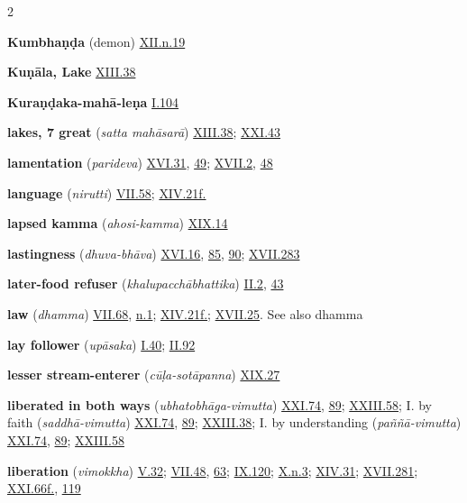 \begin{multicols}{2}
\begin{vismHanging}
\par\textbf{Kumbhaṇḍa} (demon) \hyperlink{XII.n19}{XII.n.19}{}
\par\textbf{Kuṇāla, Lake} \hyperlink{XIII.38}{XIII.38}{}
\par\textbf{Kuraṇḍaka-mahā-leṇa} \hyperlink{I.104}{I.104}{}
\par\textbf{lakes, 7 great} (\emph{satta mahāsarā}) \hyperlink{XIII.38}{XIII.38}{}; \hyperlink{XXI.43}{XXI.43}{}
\par\textbf{lamentation} (\emph{parideva}) \hyperlink{XVI.31}{XVI.31}{}, \hyperlink{XVI.49}{49}{}; \hyperlink{XVII.2}{XVII.2}{}, \hyperlink{XVII.48}{48}{}
\par\textbf{language} (\emph{nirutti}) \hyperlink{VII.58}{VII.58}{}; \hyperlink{XIV.21}{XIV.21f.}{}
\par\textbf{lapsed kamma} (\emph{ahosi-kamma}) \hyperlink{XIX.14}{XIX.14}{}
\par\textbf{lastingness} (\emph{dhuva-bhāva}) \hyperlink{XVI.16}{XVI.16}{}, \hyperlink{XVI.85}{85}{}, \hyperlink{XVI.90}{90}{}; \hyperlink{XVII.283}{XVII.283}{}
\par\textbf{later-food refuser} (\emph{khalupacchābhattika}) \hyperlink{II.2}{II.2}{}, \hyperlink{II.43}{43}{}
\par\textbf{law} (\emph{dhamma}) \hyperlink{VII.68}{VII.68}{}, \hyperlink{VII.n1}{n.1}{}; \hyperlink{XIV.21}{XIV.21f.}{}; \hyperlink{XVII.25}{XVII.25}{}. See also dhamma 
\par\textbf{lay follower} (\emph{upāsaka}) \hyperlink{I.40}{I.40}{}; \hyperlink{II.92}{II.92}{}
\par\textbf{lesser stream-enterer} (\emph{cūḷa-sotāpanna}) \hyperlink{XIX.27}{XIX.27}{}
\par\textbf{liberated in both ways} (\emph{ubhatobhāga-vimutta}) \hyperlink{XXI.74}{XXI.74}{}, \hyperlink{XXI.89}{89}{}; \hyperlink{XXIII.58}{XXIII.58}{}; I. by faith (\emph{saddhā-vimutta}) \hyperlink{XXI.74}{XXI.74}{}, \hyperlink{XXI.89}{89}{}; \hyperlink{XXIII.38}{XXIII.38}{}; I. by understanding (\emph{paññā-vimutta}) \hyperlink{XXI.74}{XXI.74}{}, \hyperlink{XXI.89}{89}{}; \hyperlink{XXIII.58}{XXIII.58}{}
\par\textbf{liberation} (\emph{vimokkha}) \hyperlink{V.32}{V.32}{}; \hyperlink{VII.48}{VII.48}{}, \hyperlink{VII.63}{63}{}; \hyperlink{IX.120}{IX.120}{}; \hyperlink{X.n3}{X.n.3}{}; \hyperlink{XIV.31}{XIV.31}{}; \hyperlink{XVII.281}{XVII.281}{}; \hyperlink{XXI.66}{XXI.66f.}{}, \hyperlink{XXI.119}{119}{}

\end{vismHanging}
\end{multicols}
